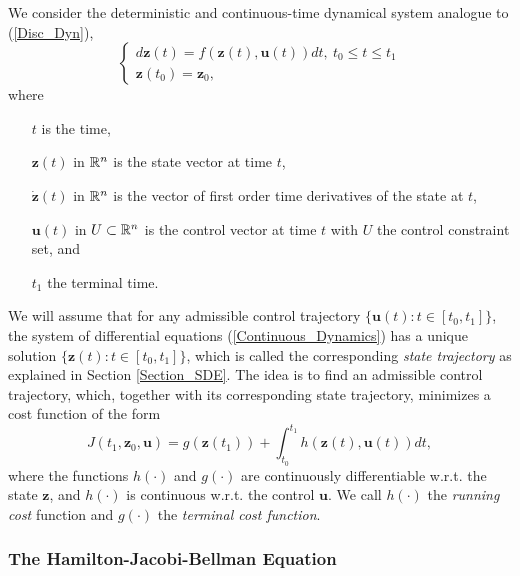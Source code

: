 We consider the deterministic and continuous-time dynamical system 
analogue to (\ref{Disc_Dyn}),
\begin{equation}
\begin{cases}
d\bm{z}(t)=f(\bm{z}(t),\bm{u}(t))dt,\ t_0\leq t\leq t_1\\
\bm{z}(t_0)=\bm{z}_0,
\end{cases}
\label{Continuous_Dynamics}
\end{equation}
where
\begin{enumerate}

\item[$t$] is the time,

\item[$\bm{z}(t)$] in $\mathbb{R}^n$ is the state vector at time $t$,

\item[$\dot{\bm{z}}(t)$] in $\mathbb{R}^n$ is the vector of first order time derivatives 
of the state at $t$,

\item[$\bm{u}(t)$] in $U\subset\mathbb{R}^n$ is the control vector at time $t$ with 
$U$ the control constraint set, and

\item[$t_1$] the terminal time.

\end{enumerate}
We will assume that for any admissible control trajectory $\{\bm{u}(t):t\in[t_0,t_1]\}$, 
the system of differential equations (\ref{Continuous_Dynamics}) has a unique solution 
$\{\bm{z}(t):t\in[t_0,t_1]\}$, which is called the corresponding \textit{state trajectory}
as explained in Section \ref{Section_SDE}. The idea is to find an admissible control 
trajectory, which, together with its corresponding state trajectory, minimizes a 
cost function of the form
\begin{equation}
J(t_1,\bm{z}_0,\bm{u})=g(\bm{z}(t_1))+\int_{t_0}^{t_1}h(\bm{z}(t),\bm{u}(t))dt,
\label{CostToGo_Function}
\end{equation}
where the functions $h(\cdot)$ and $g(\cdot)$ are continuously differentiable w.r.t. 
the state $\bm{z}$, and $h(\cdot)$ is continuous w.r.t. the control $\bm{u}$. We call $h(\cdot)$ the \textit{running cost} function and $g(\cdot)$ the \textit{terminal cost function}.

\subsubsection{The Hamilton-Jacobi-Bellman Equation} \label{Subsection_HJB}

